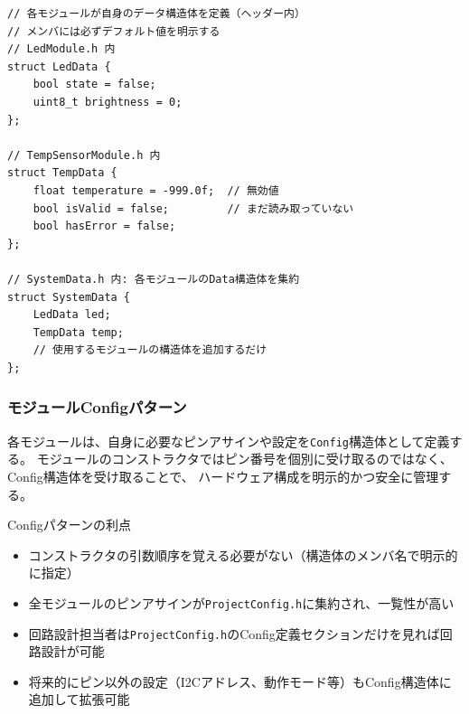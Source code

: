 \begin{lstlisting}[style=cppstyle, caption={SystemDataパターンの構造}]
// 各モジュールが自身のデータ構造体を定義（ヘッダー内）
// メンバには必ずデフォルト値を明示する
// LedModule.h 内
struct LedData {
    bool state = false;
    uint8_t brightness = 0;
};

// TempSensorModule.h 内
struct TempData {
    float temperature = -999.0f;  // 無効値
    bool isValid = false;         // まだ読み取っていない
    bool hasError = false;
};

// SystemData.h 内: 各モジュールのData構造体を集約
struct SystemData {
    LedData led;
    TempData temp;
    // 使用するモジュールの構造体を追加するだけ
};
\end{lstlisting}

\subsubsection{モジュールConfigパターン}
各モジュールは、自身に必要なピンアサインや設定を\texttt{Config}構造体として定義する。
モジュールのコンストラクタではピン番号を個別に受け取るのではなく、Config構造体を受け取ることで、
ハードウェア構成を明示的かつ安全に管理する。

\begin{funcblock}{Configパターンの利点}
\begin{itemize}
    \item コンストラクタの引数順序を覚える必要がない（構造体のメンバ名で明示的に指定）
    \item 全モジュールのピンアサインが\texttt{ProjectConfig.h}に集約され、一覧性が高い
    \item 回路設計担当者は\texttt{ProjectConfig.h}のConfig定義セクションだけを見れば回路設計が可能
    \item 将来的にピン以外の設定（I2Cアドレス、動作モード等）もConfig構造体に追加して拡張可能
\end{itemize}
\end{funcblock}

